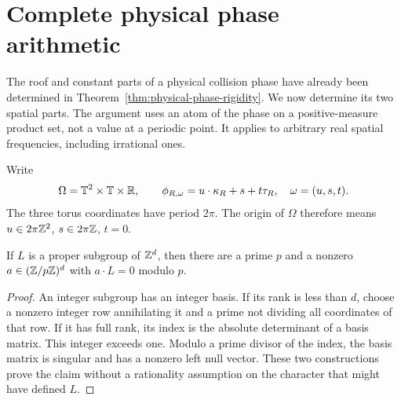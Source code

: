 \section{Complete physical phase arithmetic}
\label{sec:complete-phase-arithmetic}
The roof and constant parts of a physical collision phase have already
been determined in Theorem~\ref{thm:physical-phase-rigidity}. We now
determine its two spatial parts. The argument uses an atom of the phase
on a positive-measure product set, not a value at a periodic point.
It applies to arbitrary real spatial frequencies, including irrational
ones.

Write
\[
 \Omega=\mathbb T^2\times\mathbb T\times\mathbb R,\qquad
 \phi_{R,\omega}=u\cdot\kappa_R+s+t\tau_R,
 \quad \omega=(u,s,t).
\]
The three torus coordinates have period $2\pi$. The origin of $\Omega$
therefore means $u\in2\pi\mathbb Z^2$, $s\in2\pi\mathbb Z$, $t=0$.

\begin{lemma}
\label{lem:integer-subgroup-separation}
If $L$ is a proper subgroup of $\mathbb Z^d$, then there are a prime $p$ and a
nonzero $a\in(\mathbb Z/p\mathbb Z)^d$ with $a\cdot L=0$ modulo $p$.
\end{lemma}
\begin{proof}
An integer subgroup has an integer basis. If its rank is less than $d$,
choose a nonzero integer row annihilating it and a prime not dividing
all coordinates of that row. If it has full rank, its index is the
absolute determinant of a basis matrix. This integer exceeds one.
Modulo a prime divisor of the index, the basis matrix is singular and
has a nonzero left null vector. These two constructions prove the
claim without a rationality assumption on the character that might
have defined $L$.
\end{proof}

